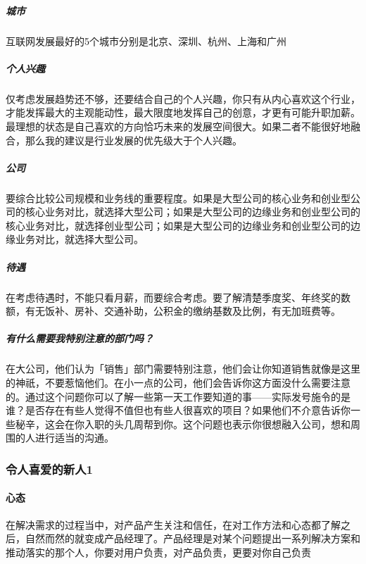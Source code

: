 \documentclass[letterpaper,11pt,english]{sphinxmanual}
\begin{document}
\subparagraph{城市}
\label{\detokenize{chapter_interview/HR:id11}}
互联网发展最好的5个城市分别是北京、深圳、杭州、上海和广州


\subparagraph{个人兴趣}
\label{\detokenize{chapter_interview/HR:id12}}
仅考虑发展趋势还不够，还要结合自己的个人兴趣，你只有从内心喜欢这个行业，才能发挥最大的主观能动性，最大限度地发挥自己的创意，才更有可能升职加薪。最理想的状态是自己喜欢的方向恰巧未来的发展空间很大。如果二者不能很好地融合，那么我的建议是行业发展的优先级大于个人兴趣。


\subparagraph{公司}
\label{\detokenize{chapter_interview/HR:id13}}
要综合比较公司规模和业务线的重要程度。如果是大型公司的核心业务和创业型公司的核心业务对比，就选择大型公司；如果是大型公司的边缘业务和创业型公司的核心业务对比，就选择创业型公司；如果是大型公司的边缘业务和创业型公司的边缘业务对比，就选择大型公司。


\subparagraph{待遇}
\label{\detokenize{chapter_interview/HR:id14}}
在考虑待遇时，不能只看月薪，而要综合考虑。要了解清楚季度奖、年终奖的数额，有无饭补、房补、交通补助，公积金的缴纳基数及比例，有无加班费等。


\subparagraph{有什么需要我特别注意的部门吗？}
\label{\detokenize{chapter_interview/HR:id15}}
在大公司，他们认为「销售」部门需要特别注意，他们会让你知道销售就像是这里的神祇，不要惹恼他们。在小一点的公司，他们会告诉你这方面没什么需要注意的。通过这个问题你可以了解一些第一天工作要知道的事——实际发号施令的是谁？是否存在有些人觉得不值但也有些人很喜欢的项目？如果他们不介意告诉你一些秘辛，这会在你入职的头几周帮到你。这个问题也表示你很想融入公司，想和周围的人进行适当的沟通。


\subsubsection{令人喜爱的新人1\sphinxfootnotemark[294]}
\label{\detokenize{chapter_interview/new_like:id1}}\label{\detokenize{chapter_interview/new_like::doc}}%
\begin{footnotetext}[294]\sphinxAtStartFootnote
{}
%
\end{footnotetext}\ignorespaces 

\paragraph{心态}
\label{\detokenize{chapter_interview/new_like:id2}}
在解决需求的过程当中，对产品产生关注和信任，在对工作方法和心态都了解之后，自然而然的就变成产品经理了。产品经理是对某个问题提出一系列解决方案和推动落实的那个人，你要对用户负责，对产品负责，更要对你自己负责
\end{document}
